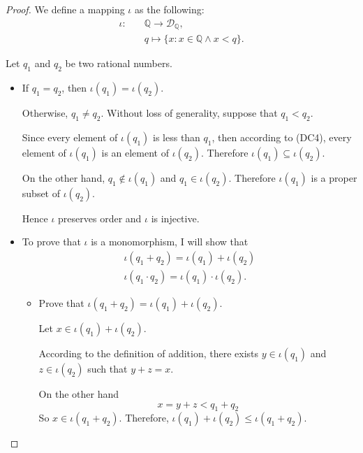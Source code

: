\begin{proof}
    We define a mapping $\iota$ as the following:
    \[
        \begin{split}
            \iota:\quad & \mathbb{Q}\to\mathscr{D}_{\mathbb{Q}}, \\
            & q\mapsto \{ x : x\in\mathbb{Q}\land x < q \}.
        \end{split}
    \]

    Let $q_{1}$ and $q_{2}$ be two rational numbers.
    \begin{itemize}
        \item If $q_{1} = q_{2}$, then $\iota(q_{1}) = \iota(q_{2})$.

              Otherwise, $q_{1}\ne q_{2}$. Without loss of generality, suppose that $q_{1} < q_{2}$.

              Since every element of $\iota(q_{1})$ is less than $q_{1}$, then according to (DC4), every element of $\iota(q_{1})$ is an element of $\iota(q_{2})$. Therefore $\iota(q_{1})\subseteq\iota(q_{2})$.

              On the other hand, $q_{1}\notin\iota(q_{1})$ and $q_{1}\in\iota(q_{2})$. Therefore $\iota(q_{1})$ is a proper subset of $\iota(q_{2})$.

              Hence $\iota$ preserves order and $\iota$ is injective.
        \item To prove that $\iota$ is a monomorphism, I will show that
              \[
                  \begin{split}
                      \iota(q_{1} + q_{2}) = \iota(q_{1}) + \iota(q_{2}) \\
                      \iota(q_{1}\cdot q_{2}) = \iota(q_{1})\cdot\iota(q_{2}).
                  \end{split}
              \]
              \begin{itemize}
                  \item Prove that $\iota(q_{1} + q_{2}) = \iota(q_{1}) + \iota(q_{2})$.

                        Let $x\in\iota(q_{1}) + \iota(q_{2})$.

                        According to the definition of addition, there exists $y\in\iota(q_{1})$ and $z\in\iota(q_{2})$ such that $y + z = x$.

                        On the other hand
                        \[
                            x = y + z < q_{1} + q_{2}
                        \]
                        So $x\in\iota(q_{1} + q_{2})$. Therefore, $\iota(q_{1}) + \iota(q_{2})\le\iota(q_{1} + q_{2})$.
                        \bigskip


\end{itemize}
\end{itemize}
\end{proof}

